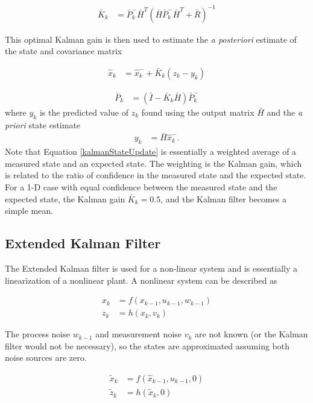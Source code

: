 \begin{align}
\bar{K}_k &=\bar{P}^-_k\bar{H}^T(\bar{H}\bar{P}^-_k\bar{H}^T + \bar{R})^{-1}
\end{align}

This optimal Kalman gain is then used to estimate the \textit{a posteriori} estimate of the state and covariance matrix

\begin{align}
\label{kalmanStateUpdate}
\hat{x}_k &=\hat{x}^-_k+\bar{K}_k(z_k-y_k)
\end{align}

\begin{align}
\bar{P}_k &= (\bar{I}-\bar{K}_k\bar{H})\bar{P}^-_k
\end{align}
\noindent
where $y_k$ is the predicted value of $z_k$ found using the output matrix $\bar{H}$ and the \textit{a priori} state estimate
\begin{align}
y_k &= \bar{H}\hat{x}^-_k.
\end{align}
Note that Equation \ref{kalmanStateUpdate} is essentially a weighted average of a measured state and an expected state. The weighting is the Kalman gain, which is related to the ratio of confidence in the measured state and the expected state. For a 1-D case with equal confidence between the measured state and the expected state, the Kalman gain $\bar{K}_k = 0.5$, and the Kalman filter becomes a simple mean.


\subsection*{Extended Kalman Filter}
\label{EKFTheory}
The Extended Kalman filter is used for a non-linear system and is essentially a linearization of a nonlinear plant. A nonlinear system can be described as \cite{welch1995introduction}

\begin{align}
x_k &= f(x_{k-1},u_{k-1},w_{k-1})\\
z_k &= h(x_k,v_k)
\end{align}

The process noise $w_{k-1}$ and measurement noise $v_k$ are not known (or the Kalman filter would not be necessary), so the states are approximated assuming both noise sources are zero.

\begin{align}
\tilde{x}_k &= f(\hat{x}_{k-1},u_{k-1},0)\\
\tilde{z}_k &= h(\tilde{x}_k,0)
\end{align}

